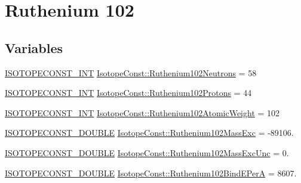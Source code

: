 \hypertarget{group___isotope_const-_ruthenium-_ru102}{}\section{Ruthenium 102}
\label{group___isotope_const-_ruthenium-_ru102}
\subsection*{Variables}
\begin{DoxyCompactItemize}
\item 
\mbox{\hyperlink{group___isotope_const-_macros_ga5f18360b3e99483a35c32d789e62621c}{I\+S\+O\+T\+O\+P\+E\+C\+O\+N\+S\+T\+\_\+\+I\+NT}} \mbox{\hyperlink{group___isotope_const-_ruthenium-_ru102_ga49d29356adf15c22739d5d3728606df2}{Isotope\+Const\+::\+Ruthenium102\+Neutrons}} = 58
\item 
\mbox{\hyperlink{group___isotope_const-_macros_ga5f18360b3e99483a35c32d789e62621c}{I\+S\+O\+T\+O\+P\+E\+C\+O\+N\+S\+T\+\_\+\+I\+NT}} \mbox{\hyperlink{group___isotope_const-_ruthenium-_ru102_ga91ef36edf99d51137a9733dd0f7cd8a7}{Isotope\+Const\+::\+Ruthenium102\+Protons}} = 44
\item 
\mbox{\hyperlink{group___isotope_const-_macros_ga5f18360b3e99483a35c32d789e62621c}{I\+S\+O\+T\+O\+P\+E\+C\+O\+N\+S\+T\+\_\+\+I\+NT}} \mbox{\hyperlink{group___isotope_const-_ruthenium-_ru102_ga9350bc1fc9c56c86e62334fa33ea23fa}{Isotope\+Const\+::\+Ruthenium102\+Atomic\+Weight}} = 102
\item 
\mbox{\hyperlink{group___isotope_const-_macros_ga8f45a7272ce02c0b4c65c44636ed719a}{I\+S\+O\+T\+O\+P\+E\+C\+O\+N\+S\+T\+\_\+\+D\+O\+U\+B\+LE}} \mbox{\hyperlink{group___isotope_const-_ruthenium-_ru102_ga0f06d86dfdeca8be69692e62b3ea4a72}{Isotope\+Const\+::\+Ruthenium102\+Mass\+Exc}} = -\/89106.
\item 
\mbox{\hyperlink{group___isotope_const-_macros_ga8f45a7272ce02c0b4c65c44636ed719a}{I\+S\+O\+T\+O\+P\+E\+C\+O\+N\+S\+T\+\_\+\+D\+O\+U\+B\+LE}} \mbox{\hyperlink{group___isotope_const-_ruthenium-_ru102_ga6ab87a10a09c14ce9509ca754381ff32}{Isotope\+Const\+::\+Ruthenium102\+Mass\+Exc\+Unc}} = 0.
\item 
\mbox{\hyperlink{group___isotope_const-_macros_ga8f45a7272ce02c0b4c65c44636ed719a}{I\+S\+O\+T\+O\+P\+E\+C\+O\+N\+S\+T\+\_\+\+D\+O\+U\+B\+LE}} \mbox{\hyperlink{group___isotope_const-_ruthenium-_ru102_ga04d15dc003b669af60e617a7482f28eb}{Isotope\+Const\+::\+Ruthenium102\+Bind\+E\+PerA}} = 8607.
\item 

\end{DoxyCompactItemize}
